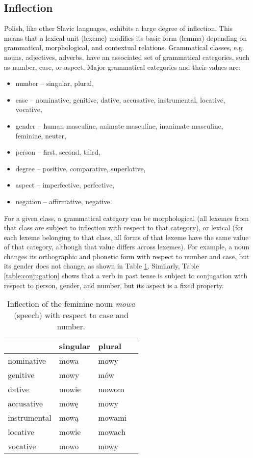 \subsection{Inflection}
\label{subsection:inflection}
Polish, like other Slavic languages, exhibits a large degree of inflection. This means that a lexical unit (lexeme) modifies its basic form (lemma) depending on grammatical, morphological, and contextual relations. Grammatical classes, e.g. nouns, adjectives, adverbs, have an associated set of grammatical categories, such as number, case, or aspect. Major grammatical categories and their values are:

\begin{itemize}
\item number -- singular, plural,
\item case -- nominative, genitive, dative, accusative, instrumental, locative, vocative,
\item gender -- human masculine, animate masculine, inanimate masculine, feminine, neuter,
\item person -- first, second, third,
\item degree -- positive, comparative, superlative,
\item aspect -- imperfective, perfective,
\item negation -- affirmative, negative.
\end{itemize}
For a given class, a grammatical category can be morphological (all lexemes from that class are subject to inflection with respect to that category), or lexical (for each lexeme belonging to that class, all forms of that lexeme have the same value of that category, although that value differs across lexemes). For example, a noun changes its orthographic and phonetic form with respect to number and case, but its gender does not change, as shown in Table \ref{table:declination}. Similarly, Table \ref{table:conjugation} shows that a verb in past tense is subject to conjugation with respect to person, gender, and number, but its aspect is a fixed property.

\begin{table}[h!]
  \begin{center}
	  \caption[Inflection of the noun \textit{mowa} (speech)]{Inflection of the feminine noun \textit{mowa} (speech) with respect to case and number.}
    \label{table:declination}
    \begin{tabular*}{.6\linewidth}{@{\extracolsep{\fill}}llll}
      & singular & plural \\
      \midrule
      nominative & mowa & mowy \\
      genitive & mowy & mów \\
      dative & mowie & mowom \\
      accusative & mowę & mowy \\
      instrumental & mową & mowami \\
      locative & mowie & mowach \\
      vocative & mowo & mowy \\
    \end{tabular*}
  \end{center}
\end{table}

